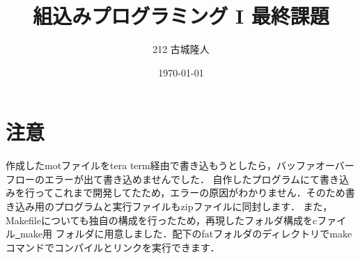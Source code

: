 \documentclass[a4paper,11pt]{ltjsarticle}
\begin{document}
\title{組込みプログラミング I 最終課題}
\author{212 古城隆人}
\date{\today}
\maketitle
\newpage
\section{注意}
作成したmotファイルをtera term経由で書き込もうとしたら，バッファオーバーフローのエラーが出て書き込めませんでした．
自作したプログラムにて書き込みを行ってこれまで開発してたため，エラーの原因がわかりません．そのため書き込み用のプログラムと実行ファイルもzipファイルに同封します．
また，Makefileについても独自の構成を行ったため，再現したフォルダ構成をcファイル\underline{~}make用 フォルダに用意しました．配下のfatフォルダのディレクトリでmakeコマンドでコンパイルとリンクを実行できます．
\end{document}
